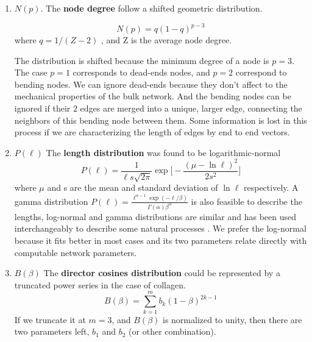\begin{enumerate}
\item \textbf{$N(p)$}. The \textbf{node degree} follow a shifted geometric
distribution.

\begin{equation} \label{degree-dist}
N(p)=q(1-q)^{p-3}
\end{equation}
where $q=1/(Z-2)$ , and Z is the average node degree.

The distribution is shifted because the minimum degree of a node is
$p=3$. The case $p=1$ corresponds to dead-ends nodes, and $p=2$ correspond to
bending nodes. We can ignore dead-ends because they don't affect to the mechanical properties of the bulk network. And the bending nodes
can be ignored if their $2$ edges are merged into a unique, larger edge,
connecting the neighbors of this bending node between them. Some information is lost in this
process if we are characterizing the length of edges by end to end
vectors.

\item \textbf{$P(\ell)$} The \textbf{length distribution} was found to be
logarithmic-normal
\begin{equation} \label{length-dist}
P(\ell)=\frac{1}{\ell
s\sqrt{2\pi}}\exp{\bigg[-\frac{(\mu-\ln{\ell})^2}{2s^2}\bigg]}
\end{equation}
where $\mu$ and s are the mean and standard deviation of $\ln{\ell}$
respectively.
A gamma distribution \( P(\ell) = \frac{\ell^{\alpha - 1}\exp(-\ell/\beta)}{\Gamma(\alpha)\beta^\alpha} \) is also feasible to describe the lengths,
log-normal and gamma distributions are similar and has been used
interchangeably to describe some natural processes \cite{cho_comparison_2004}.
We prefer the log-normal because it fits better in most cases and its two parameters
relate directly with computable network parameters.

\item \textbf{$B(\beta)$} The \textbf{director cosines distribution} could be
represented by a truncated power series in the case of collagen.
\begin{equation} \label{cosines-dist}
B(\beta)=\sum_{k=1}^{m} b_k(1-\beta)^{2k-1}
\end{equation}
If we truncate it at $m=3$, and $B(\beta)$ is normalized to unity, then there
are two parameters left, $b_1$ and $b_2$ (or other combination).
\end{enumerate}

